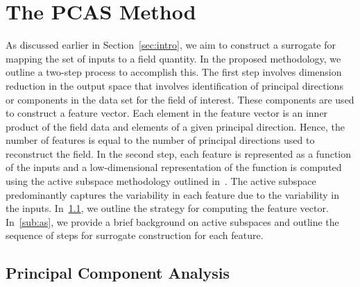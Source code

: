 \section{The PCAS Method}
\label{sec:method}

As discussed earlier in Section~\ref{sec:intro}, we aim to construct a surrogate for mapping the set of inputs to a
field quantity. In the proposed methodology, we outline a two-step process to accomplish this. The first step involves
dimension reduction in the output space that involves
identification of principal directions or components in the data set for the field of interest. These components are used
to construct a feature vector. Each element in the feature vector is an inner product of the field data and elements
of a given principal direction. Hence, the number of features is equal to the number of principal directions used to
reconstruct the field. In the second step, each feature is represented as a function of the inputs and a low-dimensional
representation of the function is computed
using the active subspace methodology outlined in~\cite{Constantine:2015}. The active subspace predominantly
captures the variability in each feature due to the variability in the inputs. 
In~\ref{sub:pca}, we outline
the strategy for computing the feature vector. In~\ref{sub:as}, we provide a brief background on active subspaces
and outline the sequence of steps for surrogate construction for each feature. 

\subsection{Principal Component Analysis}
\label{sub:pca}

